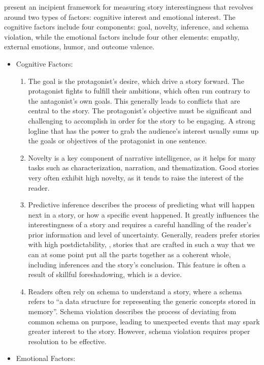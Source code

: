 \citet{bae2021preliminary} present an incipient framework for measuring story interestingness that revolves around two types of factors: cognitive interest and emotional interest. The cognitive factors include four components: goal, novelty, inference, and schema violation, while the emotional factors include four other elements: empathy, external emotions, humor, and outcome valence.
\begin{itemize}[noitemsep]
    \item Cognitive Factors:
    \begin{enumerate}
        \item The goal is the protagonist’s desire, which drive a story forward. The protagonist fights to fulfill their ambitions, which often run contrary to the antagonist's own goals. This generally leads to conflicts that are central to the story. The protagonist's objective must be significant and challenging to accomplish in order for the story to be engaging. A strong logline that has the power to grab the audience's interest usually sums up the goals or objectives of the protagonist in one sentence.
        \item Novelty is a key component of narrative intelligence, as it helps for many tasks such as characterization, narration, and thematization. Good stories very often exhibit high novelty, as it tends to raise the interest of the reader.
        \item Predictive inference describes the process of predicting what will happen next in a story, or how a specific event happened. It greatly influences the interestingness of a story and requires a careful handling of the reader's prior information and level of uncertainty. Generally, readers prefer stories with high postdictability, {\ie}, stories that are crafted in such a way that we can at some point put all the parts together as a coherent whole, including inferences and the story's conclusion. This feature is often a result of skillful foreshadowing, which is a device.
        \item Readers often rely on schema to understand a story, where a schema refers to ``a data structure for representing the generic concepts stored in memory''. Schema violation describes the process of deviating from common schema on purpose, leading to unexpected events that may spark greater interest to the story. However, schema violation requires proper resolution to be effective.
    \end{enumerate}
    \item Emotional Factors:

\end{itemize}
